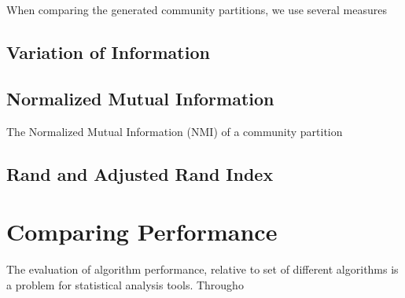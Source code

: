 When comparing the generated community partitions, we use several measures

\subsection{Variation of Information}
\cite{Marina2007}

\subsection{Normalized Mutual Information}
The Normalized Mutual Information (NMI) of a community partition 

\subsection{Rand and Adjusted Rand Index}
\cite{rand1971}


\section{Comparing Performance}

The evaluation of algorithm performance, relative to set of different algorithms is a problem for statistical analysis tools. Througho
